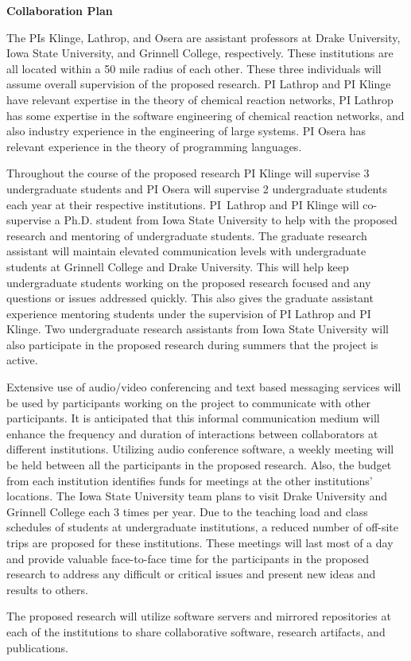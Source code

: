 \documentclass[11pt]{article}
\begin{document}
    \setcounter{page}{1}
    \begin{center}
        {\Large {\bf Collaboration Plan}}
    \end{center}

      The PIs Klinge, Lathrop, and Osera are assistant professors at Drake University, Iowa State University, and Grinnell College, respectively.
      These institutions are all located within a 50 mile radius of each other.
      These three individuals will assume overall supervision of the proposed research.
      PI Lathrop and PI Klinge have relevant expertise in the theory of chemical reaction networks, PI Lathrop has some expertise in the software engineering of chemical reaction networks, and also industry experience in the engineering of large systems.
      PI Osera has relevant experience in the theory of programming languages.
    
      Throughout the course of the proposed research PI Klinge will supervise 3 undergraduate students and PI Osera will supervise 2 undergraduate students each year at their respective institutions.
      PI~Lathrop and PI Klinge will co-supervise a Ph.D. student from Iowa State University to help with the proposed research and mentoring of undergraduate students.
      The graduate research assistant will maintain elevated communication levels with undergraduate students at Grinnell College and Drake University.
      This will help keep undergraduate students working on the proposed research focused and any questions or issues addressed quickly.
      This also gives the graduate assistant experience mentoring students under the supervision of PI Lathrop and PI Klinge.
      Two undergraduate research assistants from Iowa State University will also participate in the proposed research during summers that the project is active.
    
      Extensive use of audio/video conferencing and text based messaging services will be used by participants working on the project to communicate with other participants.
      It is anticipated that this informal communication medium will enhance the frequency and duration of interactions between collaborators at different institutions.
      Utilizing audio conference software, a weekly meeting will be held between all the participants in the proposed research.
      Also, the budget from each institution identifies funds for meetings at the other institutions' locations.
      The Iowa State University team plans to visit Drake University and Grinnell College each 3 times per year.
      Due to the teaching load and class schedules of students at undergraduate institutions, a reduced number of off-site trips are proposed for these institutions.
      These meetings will last most of a day and provide valuable face-to-face time for the participants in the proposed research to address any difficult or critical issues and present new ideas and results to others.
    
      The proposed research will utilize software servers and mirrored repositories at each of the institutions to share collaborative software, research artifacts, and publications.
    
\end{document}
